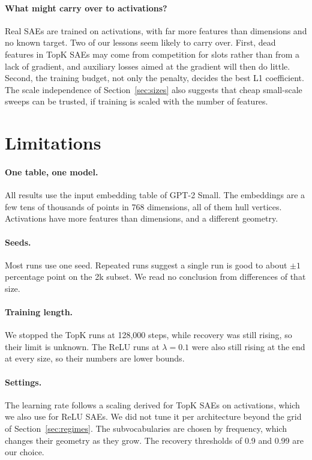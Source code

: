 \documentclass[11pt]{article}
\begin{document}
\paragraph{What might carry over to activations?} Real SAEs are trained on activations, with far more features than dimensions and no known target. Two of our lessons seem likely to carry over. First, dead features in TopK SAEs may come from competition for slots rather than from a lack of gradient, and auxiliary losses aimed at the gradient will then do little. Second, the training budget, not only the penalty, decides the best L1 coefficient. The scale independence of Section~\ref{sec:sizes} also suggests that cheap small-scale sweeps can be trusted, if training is scaled with the number of features.

\section{Limitations}
\label{sec:limitations}

\paragraph{One table, one model.} All results use the input embedding table of GPT-2 Small. The embeddings are a few tens of thousands of points in 768 dimensions, all of them hull vertices. Activations have more features than dimensions, and a different geometry.

\paragraph{Seeds.} Most runs use one seed. Repeated runs suggest a single run is good to about $\pm1$ percentage point on the 2k subset. We read no conclusion from differences of that size.

\paragraph{Training length.} We stopped the TopK runs at 128,000 steps, while recovery was still rising, so their limit is unknown. The ReLU runs at $\lambda = 0.1$ were also still rising at the end at every size, so their numbers are lower bounds.

\paragraph{Settings.} The learning rate follows a scaling derived for TopK SAEs on activations, which we also use for ReLU SAEs. We did not tune it per architecture beyond the grid of Section~\ref{sec:regimes}. The subvocabularies are chosen by frequency, which changes their geometry as they grow. The recovery thresholds of 0.9 and 0.99 are our choice.
\end{document}
